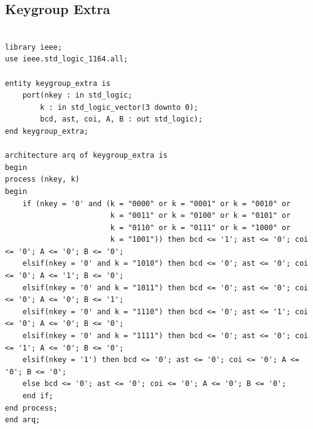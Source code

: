 \documentclass[12pt, a4papre]{article}
\begin{document}
			
			

\subsection{Keygroup Extra}


	\begin{lstlisting}[style=vhdl, frame=single, basicstyle=\tiny]

library ieee;
use ieee.std_logic_1164.all;

entity keygroup_extra is
	port(nkey : in std_logic;
		k : in std_logic_vector(3 downto 0);
		bcd, ast, coi, A, B : out std_logic);
end keygroup_extra;

architecture arq of keygroup_extra is
begin
process (nkey, k)
begin
	if (nkey = '0' and (k = "0000" or k = "0001" or k = "0010" or
						k = "0011" or k = "0100" or k = "0101" or
						k = "0110" or k = "0111" or k = "1000" or
						k = "1001")) then bcd <= '1'; ast <= '0'; coi <= '0'; A <= '0'; B <= '0';
	elsif(nkey = '0' and k = "1010") then bcd <= '0'; ast <= '0'; coi <= '0'; A <= '1'; B <= '0';
	elsif(nkey = '0' and k = "1011") then bcd <= '0'; ast <= '0'; coi <= '0'; A <= '0'; B <= '1';
	elsif(nkey = '0' and k = "1110") then bcd <= '0'; ast <= '1'; coi <= '0'; A <= '0'; B <= '0';
	elsif(nkey = '0' and k = "1111") then bcd <= '0'; ast <= '0'; coi <= '1'; A <= '0'; B <= '0';
	elsif(nkey = '1') then bcd <= '0'; ast <= '0'; coi <= '0'; A <= '0'; B <= '0';
	else bcd <= '0'; ast <= '0'; coi <= '0'; A <= '0'; B <= '0';
	end if;
end process;
end arq;


			\end{lstlisting}
			
\end{document}
